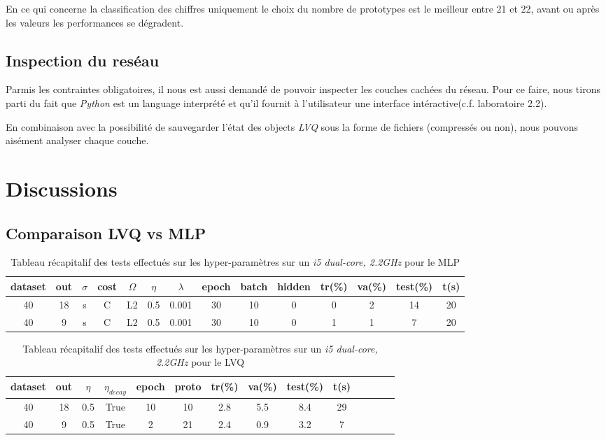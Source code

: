 \documentclass[11pt]{article}
\begin{document}
En ce qui concerne la classification des chiffres uniquement le choix
du nombre de prototypes est le meilleur entre 21 et 22, avant ou apr\`es les
valeurs les performances se d\'egradent.
\newpage

\subsection{Inspection du res\'eau}
Parmis les contraintes obligatoires, il nous est aussi demand\'e de pouvoir
inspecter les couches cach\'ees du r\'eseau. Pour ce faire, nous tirons parti du
fait que {\em Python} est un language interpr\'et\'e et qu'il fournit \`a
l'utilisateur une interface int\'eractive(c.f. laboratoire 2.2).

En combinaison avec la possibilit\'e de sauvegarder l'\'etat des
objects {\em LVQ} sous la forme de fichiers (compress\'es ou non), nous
pouvons ais\'ement analyser chaque couche.




\section{Discussions}
\subsection{Comparaison LVQ vs MLP}
\begin{table}[h]
	\centering
	\begin{tabular}{|c|c|c|c|c|c|c|c|c|c|c|c|c|c|}
		\hline
		dataset & out & $\sigma$  & cost & $\Omega$ & $\eta$ & $\lambda$ &
			epoch  & batch & hidden & tr(\%) & va(\%) & test(\%) & t(s)\\
		\hline		
		40	& 18 & s & C & L2 & 0.5 & 0.001 & 30 & 10 & 0 & 0 & 2 & 14 & 20 \\
		\hline
		40	& 9 & s & C & L2 & 0.5 & 0.001 & 30 & 10 & 0 & 1 & 1 & 7 & 20 \\
		\hline
\end{tabular}
  \caption{Tableau r\'ecapitalif des tests effectu\'es sur les
	hyper-param\`etres sur un {\em i5 dual-core, 2.2GHz} pour le MLP }
\end{table}
\begin{table}[h]
	\centering
	\begin{tabular}{|c|c|c|c|c|c|c|c|c|c|c|c|c|c|}
		\hline
		dataset & out  & $\eta$ & $\eta_{decay}$ & epoch  & proto  & tr(\%)
		& va(\%) & test(\%) & t(s)\\
		\hline		
		40	& 18 & 0.5 & True & 10 & 10 & 2.8 & 5.5 & 8.4 & 29\\
		\hline
		40	& 9 & 0.5 & True & 2 & 21 & 2.4 & 0.9 & 3.2 & 7\\
		\hline
\end{tabular}
  \caption{Tableau r\'ecapitalif des tests effectu\'es sur les
	hyper-param\`etres sur un {\em i5 dual-core, 2.2GHz} pour le LVQ }
\end{table}
\end{document}
